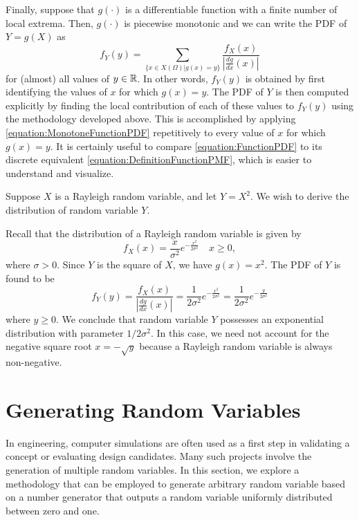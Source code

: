 Finally, suppose that $g(\cdot)$ is a differentiable function with a finite number of local extrema.
Then, $g(\cdot)$ is piecewise monotonic and we can write the PDF of $Y= g(X)$ as
\begin{equation} \label{equation:FunctionPDF}
f_Y (y) = \sum_{ \{ x \in X(\Omega) | g(x) = y \} }
\frac{f_X (x)}{\left| \frac{dg}{dx}(x) \right|}
\end{equation}
for (almost) all values of $y \in \mathbb{R}$.
In other words, $f_Y (y)$ is obtained by first identifying the values of $x$ for which $g(x) = y$.
The PDF of $Y$ is then computed explicitly by finding the local contribution of each of these values to $f_Y(y)$ using the methodology developed above.
This is accomplished by applying \eqref{equation:MonotoneFunctionPDF} repetitively to every value of $x$ for which $g(x) = y$.
It is certainly useful to compare \eqref{equation:FunctionPDF} to its discrete equivalent \eqref{equation:DefinitionFunctionPMF}, which is easier to understand and visualize.

\begin{example}
Suppose $X$ is a Rayleigh random variable, and let $Y = X^2$.
We wish to derive the distribution of random variable $Y$.

Recall that the distribution of a Rayleigh random variable is given by
\begin{equation*}
f_X (x) = \frac{x}{\sigma^2} e^{- \frac{x^2}{2 \sigma^2} } \quad x \geq 0,
\end{equation*}
where $\sigma > 0$.
Since $Y$ is the square of $X$, we have $g(x) = x^2$.
The PDF of $Y$ is found to be
\begin{equation*}
f_Y(y) = \frac{f_X (x)}{\left| \frac{dg}{dx}(x)\right|}
= \frac{1}{2 \sigma^2} e^{- \frac{x^2}{2 \sigma^2} }
= \frac{1}{2 \sigma^2} e^{- \frac{y}{2 \sigma^2} }
\end{equation*}
where $y \geq 0$.
We conclude that random variable $Y$ possesses an exponential distribution with parameter $1 / 2 \sigma^2$.
In this case, we need not account for the negative square root $x = - \sqrt{y}$ because a Rayleigh random variable is always non-negative.
\end{example}


\section{Generating Random Variables}

In engineering, computer simulations are often used as a first step in validating a concept or evaluating design candidates.
Many such projects involve the generation of multiple random variables.
In this section, we explore a methodology that can be employed to generate arbitrary random variable based on a number generator that outputs a random variable uniformly distributed between zero and one.

